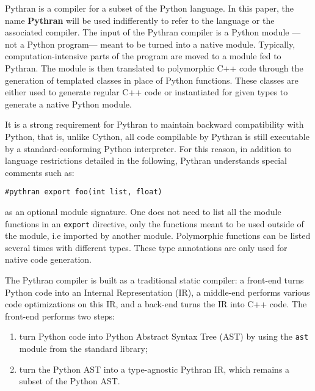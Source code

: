\documentclass[10pt, onecolumn, preprint]{sigplanconf}
\begin{document}
Pythran is a compiler for a subset of the Python language. In this paper, the
name \textbf{Pythran} will be used indifferently to refer to the language or
the associated compiler. The input of the Pythran compiler is a Python module
---not a Python program--- meant to be turned into a native module. Typically,
computation-intensive parts of the program are moved to a module fed to
Pythran. The module is then translated to polymorphic C++ code through the
generation of templated classes in place of Python functions. These
classes are either used to generate regular C++ %
code or instantiated for given types to generate a native Python module.

It is a strong requirement for Pythran to maintain backward compatibility with
Python, that is, unlike Cython, all code compilable by Pythran is still
executable by a standard-conforming Python interpreter. For this reason, in
addition to language restrictions detailed in the following, Pythran
understands special comments such as:

\begin{lstlisting}
#pythran export foo(int list, float)
\end{lstlisting}

as an optional module signature. One does not need to list all the module
functions in an \texttt{export} directive, only the functions meant to be used
outside of the module, i.e imported by another module.
Polymorphic functions can be listed several times with
different types. These type annotations are only used for native code generation.

The Pythran compiler is built as a traditional static compiler: a front-end
turns Python code into an Internal Representation (IR), a middle-end performs
various code optimizations on this IR, and a back-end turns the IR into C++
code. The front-end performs two steps:

\begin{enumerate}

    \item turn Python code into Python Abstract Syntax Tree (AST) by using the \texttt{ast}
   module from the standard library;

    \item turn the Python AST into a type-agnostic Pythran IR, which remains a subset
   of the Python AST.

\end{enumerate}
\end{document}
